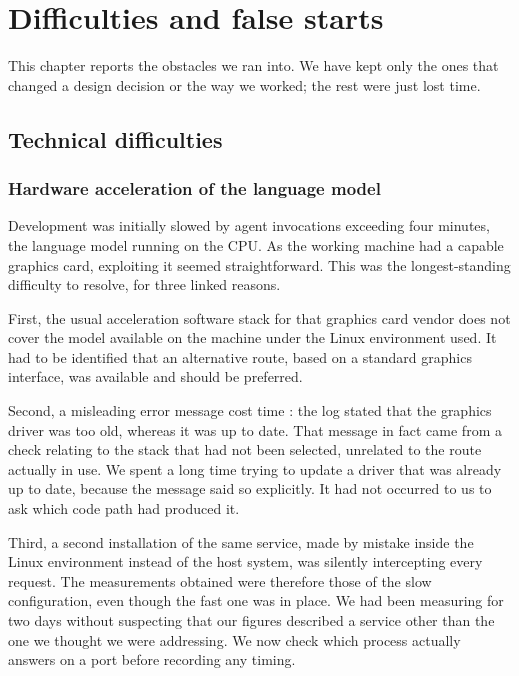\chapter{Difficulties and false starts}

This chapter reports the obstacles we ran into. We have kept only the ones that
changed a design decision or the way we worked; the rest were just lost time.

\section{Technical difficulties}

\subsection{Hardware acceleration of the language model}

Development was initially slowed by agent invocations exceeding four minutes,
the language model running on the CPU. As the working machine had a capable
graphics card, exploiting it seemed straightforward. This was the
longest-standing difficulty to resolve, for three linked reasons.

First, the usual acceleration software stack for that graphics card vendor does
not cover the model available on the machine under the Linux environment used.
It had to be identified that an alternative route, based on a standard graphics
interface, was available and should be preferred.

Second, a misleading error message cost time : the log stated that the graphics
driver was too old, whereas it was up to date. That message in fact came from a
check relating to the stack that had not been selected, unrelated to the route
actually in use. We spent a long time trying to update a driver that was already up to date,
because the message said so explicitly. It had not occurred to us to ask which
code path had produced it.

Third, a second installation of the same service, made by mistake inside the
Linux environment instead of the host system, was silently intercepting every
request. The measurements obtained were therefore those of the slow
configuration, even though the fast one was in place. We had been measuring for two days without suspecting that our figures
described a service other than the one we thought we were addressing. We now check
which process actually answers on a port before recording any timing.

